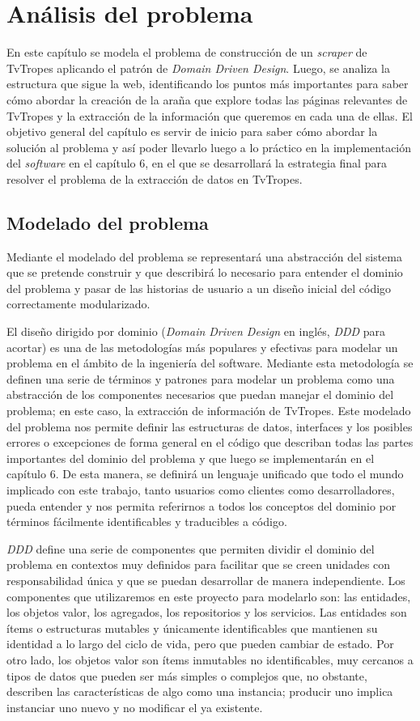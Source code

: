 \chapter{Análisis del problema}
En este capítulo se modela el problema de construcción de un \textit{scraper} de
TvTropes aplicando el patrón de \textit{Domain Driven Design}. Luego, se analiza
la estructura que sigue la web, identificando los puntos más importantes para
saber cómo abordar la creación de la araña que explore todas las páginas
relevantes de TvTropes y la extracción de la información que queremos en cada
una de ellas. El objetivo general del capítulo es servir de inicio para saber
cómo abordar la solución al problema y así poder llevarlo luego a lo práctico en
la implementación del \textit{software} en el capítulo 6, en el que se
desarrollará la estrategia final para resolver el problema de la extracción de
datos en TvTropes.

\section{Modelado del problema}
Mediante el modelado del problema se representará una abstracción del sistema
que se pretende construir y que describirá lo necesario para entender el dominio
del problema y pasar de las historias de usuario a un diseño inicial del código
correctamente modularizado. 

El diseño dirigido por dominio (\textit{Domain Driven Design} en inglés,
\textit{DDD} para acortar) es una de las metodologías más populares y efectivas
para modelar un problema en el ámbito de la ingeniería del software. Mediante
esta metodología se definen una serie de términos y patrones para modelar un
problema como una abstracción de los componentes necesarios que puedan manejar
el dominio del problema; en este caso, la extracción de información de TvTropes.
Este modelado del problema nos permite definir las estructuras de datos,
interfaces y los posibles errores o excepciones de forma general en el código
que describan todas las partes importantes del dominio del problema y que luego
se implementarán en el capítulo 6. De esta manera, se definirá un lenguaje
unificado que todo el mundo implicado con este trabajo, tanto usuarios como
clientes como desarrolladores, pueda entender y nos permita referirnos a todos
los conceptos del dominio por términos fácilmente identificables y traducibles a
código.

\textit{DDD} define una serie de componentes que permiten dividir el dominio del
problema en contextos muy definidos para facilitar que se creen unidades con
responsabilidad única y que se puedan desarrollar de manera independiente. Los
componentes que utilizaremos en este proyecto para modelarlo son: las entidades,
los objetos valor, los agregados, los repositorios y los servicios. Las
entidades son ítems o estructuras mutables y únicamente identificables que
mantienen su identidad a lo largo del ciclo de vida, pero que pueden cambiar de
estado. Por otro lado, los objetos valor son ítems inmutables no identificables,
muy cercanos a tipos de datos que pueden ser más simples o complejos que, no
obstante, describen las características de algo como una instancia; producir uno
implica instanciar uno nuevo y no modificar el ya existente.

